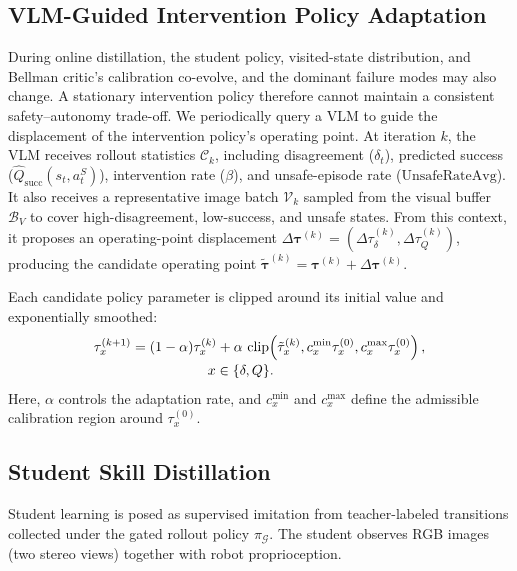 \subsection{VLM-Guided Intervention Policy Adaptation}
\label{subsec:vlm_threshold_tuner}
During online distillation, the student policy, visited-state distribution, and Bellman critic's calibration co-evolve, and the dominant failure modes may also change. A stationary intervention policy therefore cannot maintain a consistent safety--autonomy trade-off. We periodically query a VLM to guide the displacement of the intervention policy's operating point.
At iteration $k$, the VLM receives rollout statistics $\mathcal{C}_k$,
including disagreement ($\delta_t$), predicted success
($\hat Q_{\mathrm{succ}}(s_t,a_t^S)$), intervention rate ($\beta$), and
unsafe-episode rate ($\mathrm{UnsafeRateAvg}$). It also receives a
representative image batch $\mathcal{V}_k$ sampled from the visual buffer
$\mathcal{B}_V$ to cover high-disagreement, low-success, and unsafe states.
From this context, it proposes an operating-point displacement
$\Delta\boldsymbol{\tau}^{(k)}=
(\Delta\tau_\delta^{(k)},\Delta\tau_Q^{(k)})$, producing the candidate
operating point
$\tilde{\boldsymbol{\tau}}^{(k)}=
\boldsymbol{\tau}^{(k)}+\Delta\boldsymbol{\tau}^{(k)}$.

Each candidate policy parameter is clipped around its initial value and
exponentially smoothed:
\begin{equation}
\begin{aligned}
\tau_{x}^{(k+1)}
&=(1-\alpha)\tau_{x}^{(k)}
+\alpha\,\operatorname{clip}\!\left(
\tilde{\tau}_{x}^{(k)},
c_{x}^{\min}\tau_{x}^{(0)},
c_{x}^{\max}\tau_{x}^{(0)}\right),\\[-2pt]
&\hspace{5.5em}x\in\{\delta,Q\}.
\end{aligned}
\label{eq:vlm_threshold_update}
\end{equation}
Here, $\alpha$ controls the adaptation rate, and $c_x^{\min}$ and
$c_x^{\max}$ define the admissible calibration region around
$\tau_x^{(0)}$.
\subsection{Student Skill Distillation}
Student learning is posed as supervised imitation from teacher-labeled
transitions collected under the gated rollout policy $\pi_{\mathcal{G}}$. The
student observes RGB images (two stereo views) together with robot proprioception.

